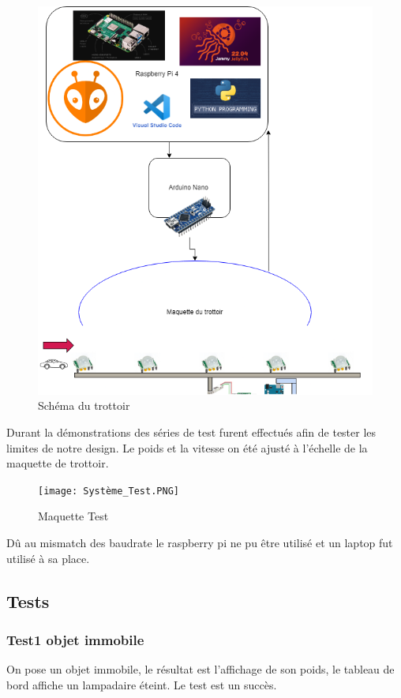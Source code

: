 \documentclass[journal]{IEEEtran}
\begin{document}
\begin{figure}[htbp]
    \centerline{\includegraphics[scale = 0.25]{Trottoir_Diagram.drawio.png}}
    \caption{Schéma du trottoir}
    \label{fig7}
\end{figure} 
Durant la démonstrations des séries de test furent effectués afin de tester les limites de notre design. Le poids et la vitesse on été ajusté à l'échelle de la maquette de trottoir.

\begin{figure}[htbp]
    \centerline{\texttt{[image: Système\_Test.PNG]}}
    \caption{Maquette Test}
    \label{fig8}
\end{figure} 

Dû au mismatch des baudrate le raspberry pi ne pu être utilisé et un laptop fut utilisé à sa place.

\subsection{Tests}

\subsubsection{Test1 objet immobile}
On pose un objet immobile, le résultat est l'affichage de son poids, le tableau de bord affiche un lampadaire éteint. Le test est un succès.
\end{document}
